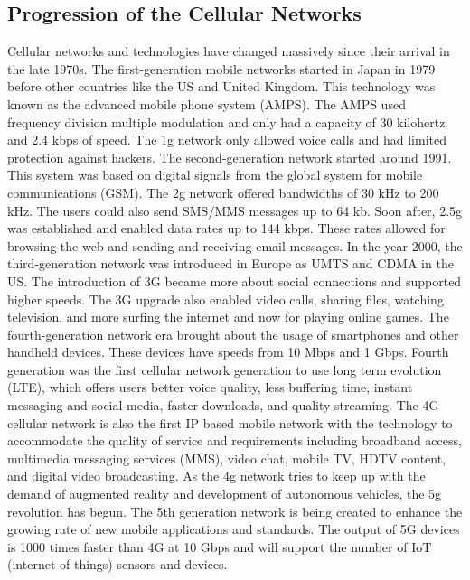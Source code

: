 \documentclass[acmlarge]{style/acmart}
\begin{document}
\subsection{Progression of the Cellular Networks}
Cellular networks and technologies have changed massively since their arrival in the late 1970s.  The first-generation mobile networks started in Japan in 1979 before other countries like the US and United Kingdom.  This technology was known as the advanced mobile phone system (AMPS).  The AMPS used frequency division multiple modulation and only had a capacity of 30 kilohertz and 2.4 kbps of speed.  The 1g network only allowed voice calls and had limited protection against hackers.  The second-generation network started around 1991.  This system was based on digital signals from the global system for mobile communications (GSM).  The 2g network offered bandwidths of 30 kHz to 200 kHz.  The users could also send SMS/MMS messages up to 64 kb.  Soon after, 2.5g was established and enabled data rates up to 144 kbps.  These rates allowed for browsing the web and sending   and receiving email messages. In the year 2000, the third-generation network was introduced in Europe as UMTS and CDMA in the US.  The introduction of 3G became more about social connections and supported higher speeds.  The 3G upgrade also enabled video calls, sharing files, watching television, and more surfing the internet and now for playing online games.  The fourth-generation network era brought about the usage of smartphones and other handheld devices.  These devices have speeds from 10 Mbps and 1 Gbps.  Fourth generation was the first cellular network generation to use long term evolution (LTE), which offers users better voice quality, less buffering time, instant messaging and social media, faster downloads, and quality streaming.    The 4G cellular network is also the first IP based mobile network with the technology to accommodate the quality of service and requirements including broadband access, multimedia messaging services (MMS), video chat, mobile TV, HDTV content, and digital video broadcasting.  As the 4g network tries to keep up with the demand of augmented reality and development of autonomous vehicles, the 5g revolution has begun.  The 5th generation network is being created to enhance the growing rate of new mobile applications and standards.  The output of 5G devices is 1000 times faster than 4G at 10 Gbps and will support the number of IoT (internet of things) sensors and devices.  
\end{document}
